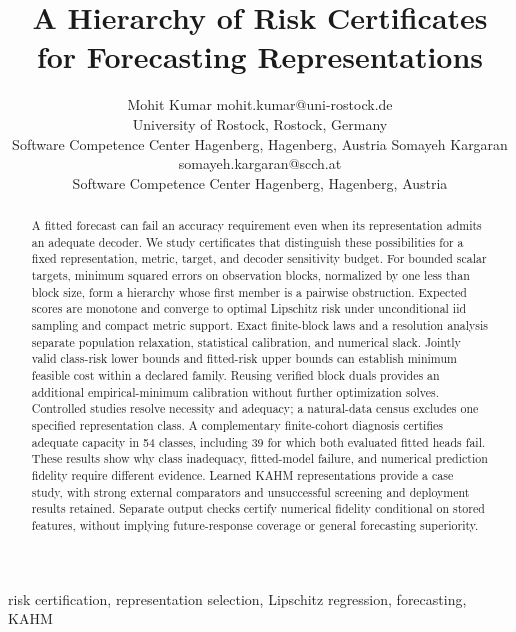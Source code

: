 \documentclass[twoside,11pt]{article}
\begin{document}
\title{A Hierarchy of Risk Certificates\\for Forecasting Representations}
\author{\name Mohit Kumar \email mohit.kumar@uni-rostock.de\\
\addr University of Rostock, Rostock, Germany\\
Software Competence Center Hagenberg, Hagenberg, Austria
\AND
\name Somayeh Kargaran \email somayeh.kargaran@scch.at\\
\addr Software Competence Center Hagenberg, Hagenberg, Austria}
\maketitle
\begin{abstract}
A fitted forecast can fail an accuracy requirement even when its representation admits an adequate decoder. We study certificates that distinguish these possibilities for a fixed representation, metric, target, and decoder sensitivity budget. For bounded scalar targets, minimum squared errors on observation blocks, normalized by one less than block size, form a hierarchy whose first member is a pairwise obstruction. Expected scores are monotone and converge to optimal Lipschitz risk under unconditional iid sampling and compact metric support. Exact finite-block laws and a resolution analysis separate population relaxation, statistical calibration, and numerical slack. Jointly valid class-risk lower bounds and fitted-risk upper bounds can establish minimum feasible cost within a declared family. Reusing verified block duals provides an additional empirical-minimum calibration without further optimization solves. Controlled studies resolve necessity and adequacy; a natural-data census excludes one specified representation class. A complementary finite-cohort diagnosis certifies adequate capacity in 54 classes, including 39 for which both evaluated fitted heads fail. These results show why class inadequacy, fitted-model failure, and numerical prediction fidelity require different evidence. Learned KAHM representations provide a case study, with strong external comparators and unsuccessful screening and deployment results retained. Separate output checks certify numerical fidelity conditional on stored features, without implying future-response coverage or general forecasting superiority.
\end{abstract}
\begin{keywords}
risk certification, representation selection, Lipschitz regression, forecasting, KAHM
\end{keywords}






\end{document}
